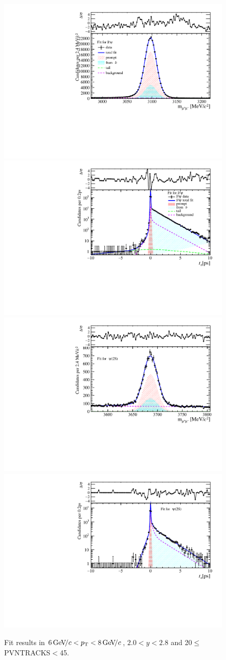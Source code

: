 \begin{figure}[H]
\begin{center}
\includegraphics[width=0.47\linewidth]{pdf/Jpsi/drawmass/n2y1pt4.pdf}
\includegraphics[width=0.47\linewidth]{pdf/Jpsi/2DFit/n2y1pt4.pdf}
\vspace*{-0.5cm}
\includegraphics[width=0.47\linewidth]{pdf/Psi2S/drawmass/n2y1pt4.pdf}
\includegraphics[width=0.47\linewidth]{pdf/Psi2S/2DFit/n2y1pt4.pdf}
\vspace*{-0.5cm}
\end{center}
\caption{Fit results in $6\text{\,Ge\kern -0.1em V\!/}c<p_{\mathrm{T}}<8\text{\,Ge\kern -0.1em V\!/}c$, $2.0<y<2.8$ and 20$\leq$PVNTRACKS$<$45.}
\label{Fitn2y1pt4}
\end{figure}

